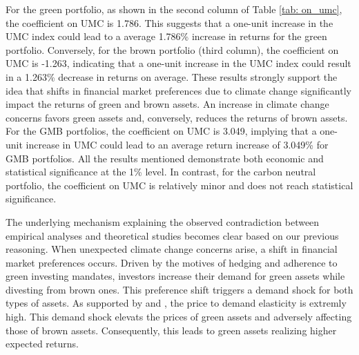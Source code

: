 \documentclass[12pt]{article}
\begin{document}
For the green portfolio, as shown in the second column of Table \ref{tab: on_umc}, the coefficient on UMC is 1.786. This suggests that a one-unit increase in the UMC index could lead to a average 1.786\% increase in returns for the green portfolio. Conversely, for the brown portfolio (third column), the coefficient on UMC is -1.263, indicating that a one-unit increase in the UMC index could result in a 1.263\% decrease in returns on average. These results strongly support the idea that shifts in financial market preferences due to climate change significantly impact the returns of green and brown assets. An increase in climate change concerns favors green assets and, conversely, reduces the returns of brown assets. For the GMB portfolios, the coefficient on UMC is 3.049, implying that a one-unit increase in UMC could lead to an average return increase of 3.049\% for GMB portfolios. All the results mentioned demonstrate both economic and statistical significance at the 1\% level. In contrast, for the carbon neutral portfolio, the coefficient on UMC is relatively minor and does not reach statistical significance.

The underlying mechanism explaining the observed contradiction between empirical analyses and theoretical studies becomes clear based on our previous reasoning. When unexpected climate change concerns arise, a shift in financial market preferences occurs. Driven by the motives of hedging and adherence to green investing mandates, investors increase their demand for green assets while divesting from brown ones. This preference shift triggers a demand shock for both types of assets. As 
supported by \citet{gabaix2021search} and \citet{hartzmark2022predictable}, the price to demand elasticity is extremly high. This demand shock elevats the prices of green assets and adversely affecting those of brown assets. Consequently, this leads to green assets realizing higher expected returns.
\end{document}
